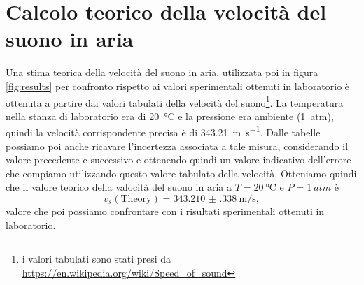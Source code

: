 \documentclass[
    rmp,
    reprint, 
    superscriptaddress, 
    altaffilletter, 
    amsmath, 
    amssymb, 
    a4paper,
    varvw]{revtex4-2}
\begin{document}
\section{Calcolo teorico della velocità del suono in aria}
Una stima teorica della velocità del suono in aria, utilizzata poi in figura \ref{fig:results} per confronto rispetto ai valori sperimentali ottenuti in laboratorio è ottenuta a partire dai valori tabulati della velocità del suono\footnote{i valori tabulati sono stati presi da \url{https://en.wikipedia.org/wiki/Speed_of_sound}}. La temperatura nella stanza di laboratorio era di \SI{20}{\celsius} e la pressione era ambiente (\SI{1}{atm}), quindi la velocità corrispondente precisa è di \SI{343.21}{\metre\per\second}. Dalle tabelle possiamo poi anche ricavare l'incertezza associata a tale misura, considerando il valore precedente e successivo e ottenendo quindi un valore indicativo dell'errore che compiamo utilizzando questo valore tabulato della velocità. Otteniamo quindi che il valore teorico della valocità del suono in aria a $T=\SI{20}{\celsius}$ e $P=\SI{1}{atm}$ è \[v_s(\text{Theory}) = \SI{343.210(338)}{\metre\per\second},\] valore che poi possiamo confrontare con i risultati sperimentali ottenuti in laboratorio. 

\setcounter{table}{0}
\renewcommand{\thetable}{A-\Roman{table}}
\end{document}
